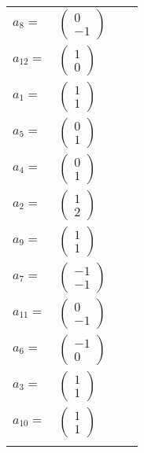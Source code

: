 \documentclass[1p]{elsarticle_modified}
\theoremstyle{definition}
\begin{document}
\begin{tabular}{m{7pt} m{180pt} m{7pt} m{180pt} }
\flushright $a_{8}=$&$\begin{pmatrix}0\\-1\end{pmatrix}$ \\
\flushright $a_{12}=$&$\begin{pmatrix}1\\0\end{pmatrix}$ \\
\flushright $a_{1}=$&$\begin{pmatrix}1\\1\end{pmatrix}$ \\
\flushright $a_{5}=$&$\begin{pmatrix}0\\1\end{pmatrix}$ \\
\flushright $a_{4}=$&$\begin{pmatrix}0\\1\end{pmatrix}$ \\
\flushright $a_{2}=$&$\begin{pmatrix}1\\2\end{pmatrix}$ \\
\flushright $a_{9}=$&$\begin{pmatrix}1\\1\end{pmatrix}$ \\
\flushright $a_{7}=$&$\begin{pmatrix}-1\\-1\end{pmatrix}$ \\
\flushright $a_{11}=$&$\begin{pmatrix}0\\-1\end{pmatrix}$ \\
\flushright $a_{6}=$&$\begin{pmatrix}-1\\0\end{pmatrix}$ \\
\flushright $a_{3}=$&$\begin{pmatrix}1\\1\end{pmatrix}$ \\
\flushright $a_{10}=$&$\begin{pmatrix}1\\1\end{pmatrix}$\\&\end{tabular}
\end{document}
